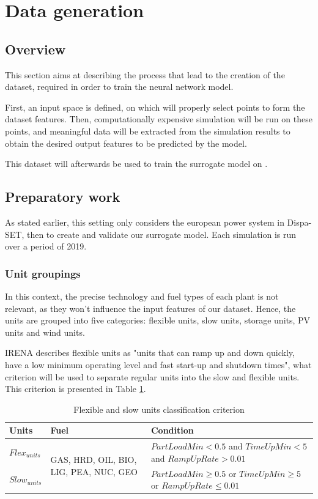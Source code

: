 \section{Data generation}

\subsection{Overview}

This section aims at describing the process that lead to the creation of the dataset, required in order to train the neural network model.

First, an input space is defined, on which will properly select points to form the dataset features. Then, computationally expensive simulation will be run on these points, and meaningful data will be extracted from the simulation results to obtain the desired output features to be predicted by the model.

This dataset will afterwards be used to train the surrogate model on \cite{surrogate_model}.

\subsection{Preparatory work}

As stated earlier, this setting only considers the european power system in Dispa-SET, then to create and validate our surrogate model. Each simulation is run over a period of 2019.

\subsubsection{Unit groupings}
In this context, the precise technology and fuel types of each plant is not relevant, as they won't influence the input features of our dataset. Hence, the units are grouped into five categories: flexible units, slow units, storage units, PV units and wind units.

IRENA \cite{irena} describes flexible units as "units that can ramp up and down quickly, have a low minimum operating level and fast start-up and shutdown times", what criterion will be used to separate regular units into the slow and flexible units. This criterion is presented in Table \ref{table:flex-vs-slow-unit}.

\begin{table}[h!]
    \centering
	\begin{tabular}{|l | l | p{8cm}|}
		\hline
		Units & Fuel & Condition \\
		\hline
		$Flex_{units}$ & \multirow{2}{3cm}{GAS, HRD, OIL, BIO, LIG, PEA, NUC, GEO} & $PartLoadMin<0.5$ and $TimeUpMin<5$ and $RampUpRate>0.01$\\ \cline{1-1} \cline{3-3}
		$Slow_{units}$ &  & $PartLoadMin\geq 0.5$ or $TimeUpMin \geq 5$ or $RampUpRate\leq 0.01$\\
		\hline
	\end{tabular}
	\caption{Flexible and slow units classification criterion}
	\label{table:flex-vs-slow-unit}
\end{table}

